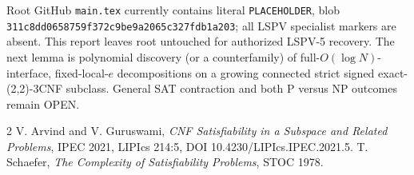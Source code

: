 \documentclass[11pt]{article}
\begin{document}
Root GitHub \texttt{main.tex} currently contains literal
\texttt{PLACEHOLDER}, blob
\texttt{311c8dd0658759f372c9be9a2065c327fdb1a203};
all LSPV specialist markers are absent. This report leaves
root untouched for authorized LSPV-5 recovery.
The next lemma is polynomial discovery (or a counterfamily)
of full-$O(\log N)$-interface, fixed-local-$e$ decompositions
on a growing connected strict signed exact-(2,2)-3CNF subclass.
General SAT contraction and both P versus NP outcomes remain OPEN.

\begin{thebibliography}{2}
 V. Arvind and V. Guruswami,
\emph{CNF Satisfiability in a Subspace and Related Problems},
IPEC 2021, LIPIcs 214:5, DOI 10.4230/LIPIcs.IPEC.2021.5.
 T. Schaefer,
\emph{The Complexity of Satisfiability Problems}, STOC 1978.
\end{thebibliography}
\end{document}
